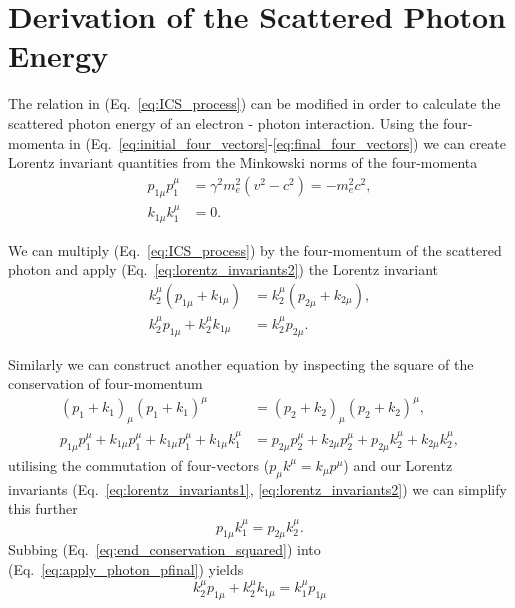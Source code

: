 \documentclass[../main.tex]{subfiles}
\begin{document}
\section{Derivation of the Scattered Photon Energy}
\label{sec:derivation_of_the_scattered_photon_energy}

The relation in (Eq.~\ref{eq:ICS_process}) can be modified in order to calculate the scattered photon energy of an electron - photon interaction. Using the four-momenta in (Eq.~\ref{eq:initial_four_vectors}-\ref{eq:final_four_vectors}) we can create Lorentz invariant quantities from the Minkowski norms of the four-momenta 
\begin{align}
p_{1\mu}p_{1}^{\mu} &= \gamma^{2}m_{e}^{2}\left(v^{2}-c^{2}\right) = -m_{e}^{2}c^{2},
\label{eq:lorentz_invariants1} \\
k_{1\mu}k_{1}^{\mu} &= 0.
\label{eq:lorentz_invariants2}
\end{align}

We can multiply (Eq.~\ref{eq:ICS_process}) by the four-momentum  of the scattered photon and apply (Eq.~\ref{eq:lorentz_invariants2}) the Lorentz invariant 
\begin{align}
k_{2}^{\mu}\left(p_{1\mu} + k_{1\mu}\right) &= k_{2}^{\mu}\left(p_{2\mu} + k_{2\mu}\right), \\
k_{2}^{\mu}p_{1\mu}+k_{2}^{\mu}k_{1\mu} &= k_{2}^{\mu}p_{2\mu}.
\label{eq:apply_photon_pfinal}
\end{align}

Similarly we can construct another equation by inspecting the square of the conservation of four-momentum
\begin{align}
\left(p_{1}+k_{1}\right)_{\mu}\left(p_{1}+k_{1}\right)^{\mu} &= \left(p_{2}+k_{2}\right)_{\mu}\left(p_{2}+k_{2}\right)^{\mu}, \\
p_{1\mu}p_{1}^{\mu}+k_{1\mu}p_{1}^{\mu}+k_{1\mu}p_{1}^{\mu}+k_{1\mu}k_{1}^{\mu} &= p_{2\mu}p_{2}^{\mu}+k_{2\mu}p_{2}^{\mu}+p_{2\mu}k_{2}^{\mu}+k_{2\mu}k_{2}^{\mu},
\label{eq:apply_conservation_squared}
\end{align}
utilising the commutation of four-vectors ($p_{\mu}k^{\mu} = k_{\mu}p^{\mu}$) and our Lorentz invariants (Eq.~\ref{eq:lorentz_invariants1}, \ref{eq:lorentz_invariants2}) we can simplify this further 
\begin{equation}
p_{1\mu}k_{1}^{\mu} = p_{2\mu}k_{2}^{\mu}.
\label{eq:end_conservation_squared}
\end{equation}
Subbing (Eq.~\ref{eq:end_conservation_squared}) into (Eq.~\ref{eq:apply_photon_pfinal}) yields
\begin{equation}
k_{2}^{\mu}p_{1\mu}+k_{2}^{\mu}k_{1\mu} = k_{1}^{\mu}p_{1\mu}
\label{eq:substitution_four_vector}
\end{equation}
\end{document}

